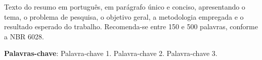 \begin{resumo}

 Texto do resumo em português, em parágrafo único e conciso, apresentando o tema, o problema de pesquisa, o objetivo geral, a metodologia empregada e o resultado esperado do trabalho. Recomenda-se entre 150 e 500 palavras, conforme a NBR 6028.

 \vspace{\onelineskip}
 \noindent \textbf{Palavras-chave}: Palavra-chave 1. Palavra-chave 2. Palavra-chave 3.
\end{resumo}
